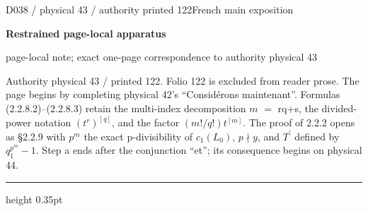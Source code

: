 \documentclass[9pt]{article}
\newcommand{\CanonText}[1]{\par{\fontsize{8.0}{9.35}\selectfont\RaggedRight #1\par}\vspace{2.2pt}}
\newcommand{\LayerTitle}{Restrained page-local apparatus}
\begin{document}
\noindent\begin{minipage}[t][\dimexpr\textheight-5pt\relax][t]{\textwidth}
{\sffamily\fontsize{7.3}{8.2}\selectfont\color{Quiet} D038 / physical 43 / authority printed 122\hfill French main exposition}
\par{}\vspace{4.5pt}
{\sffamily\fontsize{10.4}{11.6}\selectfont\bfseries\color{Accent} \LayerTitle}
\par{\sffamily\fontsize{6.7}{7.7}\selectfont\color{Quiet} page-local note; exact one-page correspondence to authority physical 43}
\vspace{5pt}
\CanonText{Authority physical 43 / printed 122. Folio 122 is excluded from reader prose. The page begins by completing physical 42's “Considérons maintenant”. Formulas (2.2.8.2)–(2.2.8.3) retain the multi-index decomposition \(m\) \(=\) rq+s, the divided-power notation \((t^{r})^{[q]}\), and the factor \((m!/q!)t^{[m]}\). The proof of 2.2.2 opens as §2.2.9 with \(p^{m}\) the exact p-divisibility of \(c_{1}(L_{0})\), \(p\nmid{}y\), and \(T^{\prime}\) defined by \(q_{1}^{p^{m}}-1\). Step a ends after the conjunction “et”; its consequence begins on physical 44.}
\vfill
{\color{Accent}\hrule height 0.35pt}\vspace{3pt}
\end{minipage}
\newpage
\end{document}
